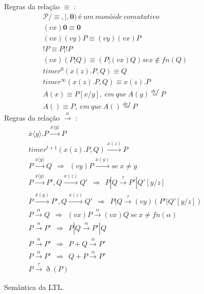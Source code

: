 \begin{figure}[ht]
	\centering
	Regras da relação $\equiv$ :
	\begin{align}
		& \mathcal{P}/ \equiv, |, \textbf{0})~é~um~monóide~comutativo \\
		& (vx)\textbf{0} \equiv \textbf{0} \\
		& (vx)(vy)P \equiv (vy)(vx)P \\
		& !P \equiv P|!P \\
		& (vx)(P|Q) \equiv (P|(vx)Q) se x \notin fn(Q) \\ 
		& timer^{0}(x(z).P,Q) \equiv Q \label{eq:6} \\ 
		& timer^{\infty}(x(z).P,Q) \equiv x(z).P \label{eq:7} \\
		& A(x) \equiv P[x/y],~em~que~A(y) \stackrel{def}{=} P \label{eq:8} \\
		& A() \equiv P,~em~que~A() \stackrel{def}{=} P \label{eq:9}
	\end{align}
	Regras da relação $\stackrel{\alpha}{\longrightarrow}$ : 
	\begin{align}
		& \overline{x}\langle y \rangle.P \stackrel{\overline{x}\langle y \rangle}{\longrightarrow} P \\		
		& timer^{t+1}(x(z).P,Q) \stackrel{x(z)}{\longrightarrow} P \\
		& P \stackrel{\overline{x}\langle y \rangle}{\longrightarrow} Q ~~ \Rightarrow ~~ (vy)P \stackrel{\overline{x}(y)}{\longrightarrow} se~ x \neq y \\
		& P \stackrel{\overline{x}\langle y \rangle}{\longrightarrow} P', Q \stackrel{x(z)}{\longrightarrow} Q' ~~ \Rightarrow ~~ P|Q \stackrel{\tau}{\longrightarrow} P' | Q'[y/z] \\
		& P \stackrel{\overline{x}(y)}{\longrightarrow} P', Q \stackrel{x(z)}{\longrightarrow} Q' ~~ \Rightarrow ~~ P|Q \stackrel{\tau}{\longrightarrow} (vy)(P'|Q'[y/z]) \\
		& P \stackrel{\alpha}{\longrightarrow} Q ~~ \Rightarrow ~~ (vx)P \stackrel{\alpha}{\longrightarrow} (vx)Q~se~ x \neq fn(\alpha) \\
		& P \stackrel{\alpha}{\longrightarrow} P' ~~ \Rightarrow ~~ P|Q \stackrel{\alpha}{\longrightarrow} P'|Q \\
		& P \stackrel{\alpha}{\longrightarrow} P' ~~ \Rightarrow ~~ P + Q\stackrel{\alpha}{\longrightarrow} P' \\
		& P \stackrel{\alpha}{\longrightarrow} P' ~~ \Rightarrow ~~ Q + P\stackrel{\alpha}{\longrightarrow} P' \\ \label{eq:19}
		& P \stackrel{\tau}{\longrightarrow} \eth  (P)
	\end{align}
	\caption{Semântica da LTL.
		\label{fig:ltl_sema}}
\end{figure}
\FloatBarrier



